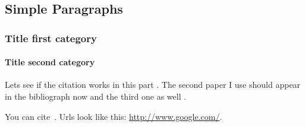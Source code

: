 
      



  \subsection[Paragraphs]{Simple Paragraphs}
  \begin{frame}[fragile]
    \frametitle{Title first category}
    \framesubtitle{Title second category}
  
    Lets see if the citation works in this part \cite{main_paper}. The second paper I use
    should appear in the bibliograph now \cite{kernel_estimation_1} and the third one as well
    \cite{kernel_estimation_2}.
  
    You can cite~\cite{Tan11}. Urls look like this: \url{http://www.google.com/}.
  \end{frame}